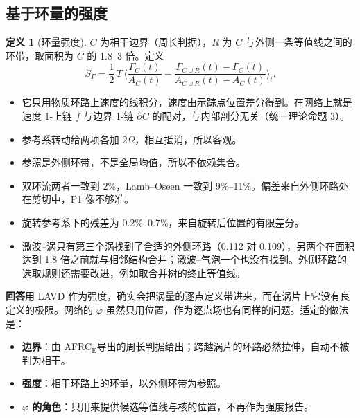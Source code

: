 \documentclass[10.5pt,a4paper]{article}
\newcommand{\AFE}{AFRC$_{\mathrm E}$}
\newcommand{\keyp}[1]{\textbf{\sffamily #1}}
\newenvironment{finding}{\begin{center}\begin{minipage}{0.94\linewidth}\setlength{\parskip}{0.3em}\color{black}}{\end{minipage}\end{center}}
\theoremstyle{definition}
\newtheorem{definition}{定义}[section]
\theoremstyle{plain}
\theoremstyle{remark}
\begin{document}
\subsection{基于环量的强度}
\begin{definition}[环量强度]
$C$ 为相干边界（周长判据），$R$ 为 $C$ 与外侧一条等值线之间的环带，取面积为 $C$ 的 1.8–3 倍。定义
\begin{equation}
S_\Gamma=\frac12\,T\,\Big\langle \frac{\Gamma_C(t)}{A_C(t)}-\frac{\Gamma_{C\cup R}(t)-\Gamma_C(t)}{A_{C\cup R}(t)-A_C(t)}\Big\rangle_t .
\end{equation}
\end{definition}
\begin{itemize}
\item 它只用物质环路上速度的线积分，速度由示踪点位置差分得到。在网络上就是速度 1-上链 $f$ 与边界 1-链 $\partial C$ 的配对，与内部剖分无关（统一理论命题 3）。
\item 参考系转动给两项各加 $2\Omega$，相互抵消，所以客观。
\item 参照是外侧环带，不是全局均值，所以不依赖集合。
\end{itemize}
\begin{table}[H]\centering\small\caption{环量强度与 $\varphi$ 型强度（$C$ 内平均减环带平均）的比较。旋转参考系为窗口内转 0.6 rad 并平移。}\resizebox{\linewidth}{!}{}\end{table}
\begin{itemize}
\item 双环流两者一致到 2\%，Lamb–Oseen 一致到 9\%–11\%。偏差来自外侧环路处在剪切中，P1 像不够准。
\item 旋转参考系下的残差为 0.2\%–0.7\%，来自旋转后位置的有限差分。
\item 激波–涡只有第三个涡找到了合适的外侧环路（0.112 对 0.109），另两个在面积达到 1.8 倍之前就与相邻结构合并；激波–气泡一个也没有找到。外侧环路的选取规则还需要改进，例如取合并树的终止等值线。
\end{itemize}

\begin{finding}
\keyp{回答}\quad 用 LAVD 作为强度，确实会把涡量的逐点定义带进来，而在涡片上它没有良定义的极限。网络的 $\varphi$ 虽然只用位置，作为逐点场也有同样的问题。适定的做法是：
\begin{itemize}[leftmargin=1.2em]
\item \keyp{边界}：由 \AFE 导出的周长判据给出；跨越涡片的环路必然拉伸，自动不被判为相干。
\item \keyp{强度}：相干环路上的环量，以外侧环带为参照。
\item \keyp{$\varphi$ 的角色}：只用来提供候选等值线与核的位置，不再作为强度报告。
\end{itemize}
\end{finding}
\end{document}
